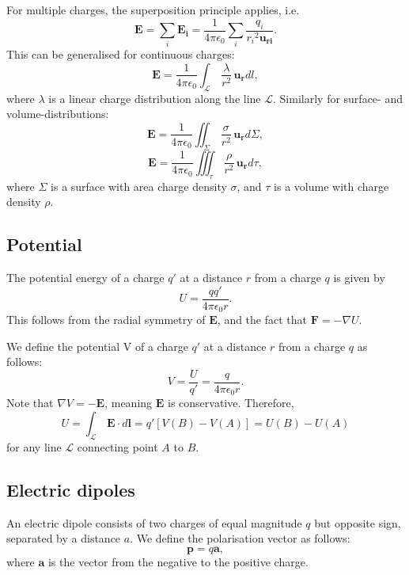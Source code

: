 \documentclass[a4paper, 12pt]{article}
\renewcommand{\vec}[1]{\mathbf{#1}}
\newcommand{\E}{\ensuremath{\vec{E}}}
\newcommand{\e}{\ensuremath{\epsilon_0}}
\begin{document}
    For multiple charges, the superposition principle applies, i.e. 
    \begin{equation}
        \E = \sum_i\vec{E_i} = \frac{1}{4\pi\e}\sum_i\frac{q_i}{{r_i}^2\vec{u_{ri}}}.
    \end{equation}
    This can be generalised for continuous charges: 
    \begin{equation}
        \E = \frac{1}{4\pi\e}\int_\mathcal{L}\,\frac{\lambda}{r^2}\,\vec{u_r}dl,
    \end{equation}
    where $\lambda$ is a linear charge distribution along the line $\mathcal{L}$. Similarly for surface- and volume-distributions: 
    \begin{equation}
        \E = \frac{1}{4\pi\e}\iint_\Sigma\,\frac{\sigma}{r^2}\,\vec{u_r}d\Sigma,
    \end{equation}
    \begin{equation}
        \E = \frac{1}{4\pi\e}\iiint_{\tau}\,\frac{\rho}{r^2}\,\vec{u_r}d\tau,
    \end{equation}
    where $\Sigma$ is a surface with area charge density $\sigma$, and $\tau$ is a volume with charge density $\rho$.
    
\subsection{Potential}
    The potential energy of a charge $q'$ at a distance $r$ from a charge $q$ is given by
    \begin{equation}
        U = \frac{qq'}{4\pi\e r}.
    \end{equation}
    This follows from the radial symmetry of \E, and the fact that $\vec{F} = - \nabla U$.
    
    
    We define the potential V of a charge $q'$ at a distance $r$ from a charge $q$ as follows: 
    \begin{equation}
        V = \frac{U}{q'} = \frac{q}{4\pi\e r}.
    \end{equation}
    Note that $\nabla V = -\E$, meaning $\E$ is conservative. Therefore, 
    \begin{equation}
        U = \int_\mathcal{L}\,\E\cdot d\vec{l} = q'[V(B) - V(A)] = U(B) - U(A)
    \end{equation}
    for any line $\mathcal{L}$ connecting point $A$ to $B$.
\subsection{Electric dipoles}
    An electric dipole consists of two charges of equal magnitude $q$ but opposite sign, separated by a distance $a$. We define the polarisation vector as follows: 
    \begin{equation}
        \vec{p} = q\vec{a},
    \end{equation}
    where $\vec{a}$ is the vector from the negative  to the positive charge. 
    
\end{document}
